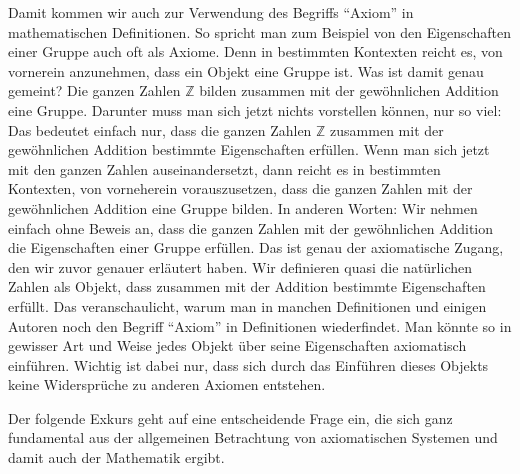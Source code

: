 Damit kommen wir auch zur Verwendung des Begriffs "`Axiom"' in mathematischen Definitionen. So spricht man zum Beispiel von den Eigenschaften einer Gruppe auch oft als Axiome. Denn in bestimmten Kontexten reicht es, von vornerein anzunehmen, dass ein Objekt eine Gruppe ist. Was ist damit genau gemeint? Die ganzen Zahlen \(\mathbb Z\) bilden zusammen mit der gewöhnlichen Addition eine Gruppe. Darunter muss man sich jetzt nichts vorstellen können, nur so viel: Das bedeutet einfach nur, dass die ganzen Zahlen \(\mathbb Z\) zusammen mit der gewöhnlichen Addition bestimmte Eigenschaften erfüllen. Wenn man sich jetzt mit den ganzen Zahlen auseinandersetzt, dann reicht es in bestimmten Kontexten, von vorneherein vorauszusetzen, dass die ganzen Zahlen mit der gewöhnlichen Addition eine Gruppe bilden. In anderen Worten: Wir nehmen einfach ohne Beweis an, dass die ganzen Zahlen mit der gewöhnlichen Addition die Eigenschaften einer Gruppe erfüllen. Das ist genau der axiomatische Zugang, den wir zuvor genauer erläutert haben. Wir definieren quasi die natürlichen Zahlen als Objekt, dass zusammen mit der Addition bestimmte Eigenschaften erfüllt. Das veranschaulicht, warum man in manchen Definitionen und einigen Autoren noch den Begriff "`Axiom"' in Definitionen wiederfindet. Man könnte so in gewisser Art und Weise jedes Objekt über seine Eigenschaften axiomatisch einführen. Wichtig ist dabei nur, dass sich durch das Einführen dieses Objekts keine Widersprüche zu anderen Axiomen entstehen. 

Der folgende Exkurs geht auf eine entscheidende Frage ein, die sich ganz fundamental aus der allgemeinen Betrachtung von axiomatischen Systemen und damit auch der Mathematik ergibt. 

